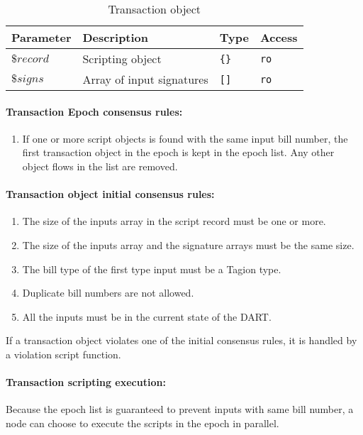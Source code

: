 \begin{table}[H]
\begin{center}
\begin{tabular}{|l|p{7cm}|p{1.5cm}|l|}
%
\hline
Parameter & Description & Type & Access \\
\hline
$\$record$ & Scripting object & \texttt{\{\}} & \texttt{ro} \\
\hline
$\$signs$ & Array of input signatures & \texttt{[]} & \texttt{ro} \\
\hline
\end{tabular}
\end{center}
\caption{Transaction object}
\label{tab:transaction_object}
\end{table}

\paragraph{Transaction Epoch consensus rules:}
\begin{enumerate}
 \item 
 If one or more script objects is found with the same input bill number, the first transaction object in the epoch is kept in the epoch list. Any other object flows in the list are removed.
\end{enumerate}


\paragraph{Transaction object initial consensus rules:}
\begin{enumerate}
 \item 
    The size of the inputs array in the script record must be one or more.
 \item 
    The size of the inputs array and the signature arrays must be the same size.
 \item 
    The bill type of the first type input must be a Tagion type.
 \item 
    Duplicate bill numbers are not allowed.
 \item 
    All the inputs must be in the current state of the DART.
\end{enumerate}
If a transaction object violates one of the initial consensus rules, it is handled by a violation script function.

\paragraph{Transaction scripting execution:}
Because the epoch list is guaranteed to prevent inputs with same bill number, a node can choose to execute the scripts in the epoch in parallel.

